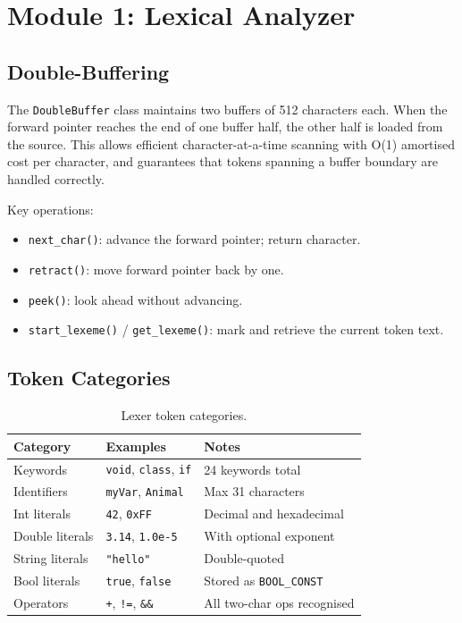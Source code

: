 \documentclass[12pt,a4paper]{article}
\begin{document}
\section{Module 1: Lexical Analyzer}

\subsection{Double-Buffering}

The \texttt{DoubleBuffer} class maintains two buffers of 512 characters each.
When the forward pointer reaches the end of one buffer half, the other half is
loaded from the source. This allows efficient character-at-a-time scanning with
O(1) amortised cost per character, and guarantees that tokens spanning a buffer
boundary are handled correctly.

Key operations:
\begin{itemize}
  \item \texttt{next\_char()}: advance the forward pointer; return character.
  \item \texttt{retract()}: move forward pointer back by one.
  \item \texttt{peek()}: look ahead without advancing.
  \item \texttt{start\_lexeme()} / \texttt{get\_lexeme()}: mark and retrieve the
        current token text.
\end{itemize}

\subsection{Token Categories}

\begin{table}[h]
\centering
\begin{tabular}{lll}
\toprule
\textbf{Category} & \textbf{Examples} & \textbf{Notes} \\
\midrule
Keywords  & \texttt{void}, \texttt{class}, \texttt{if} & 24 keywords total \\
Identifiers & \texttt{myVar}, \texttt{Animal} & Max 31 characters \\
Int literals & \texttt{42}, \texttt{0xFF} & Decimal and hexadecimal \\
Double literals & \texttt{3.14}, \texttt{1.0e-5} & With optional exponent \\
String literals & \texttt{"hello"} & Double-quoted \\
Bool literals & \texttt{true}, \texttt{false} & Stored as \texttt{BOOL\_CONST} \\
Operators & \texttt{+}, \texttt{!=}, \texttt{\&\&} & All two-char ops recognised \\
\bottomrule
\end{tabular}
\caption{Lexer token categories.}
\end{table}
\end{document}
